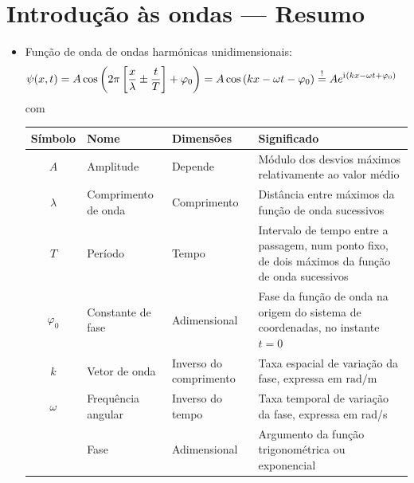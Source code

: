 \newpage
\section*{Introdução às ondas --- Resumo}
\begin{itemize}
\item
    Função de onda de ondas harmónicas unidimensionais:
    \begin{align*}
      \psi(x,t)&=A\cos\left(2\pi\left[\frac{x}{\lambda}\pm\frac{t}{T}\right]+
                \varphi_0\right)
               =A\cos\left(kx-\omega t-\varphi_0\right)\stackrel{!}{=}
               Ae^{\text{i}\mkern1mu (kx-\omega t+\varphi_0)}
    \end{align*}
    com
    \begin{center}
    \begin{tabular}{c|l|l|l}
    \hline
    \rule{0mm}{3ex} Símbolo&Nome&Dimensões&Significado\\[0.5ex]
    \hline
    $A$ & Amplitude & Depende&
        \parbox[t]{0.3\textwidth}{\rule{0mm}{4ex}Módulo dos desvios máxi\-mos
        relativamente ao valor médio}\\
    $\lambda$ & Comprimento de onda & Comprimento &
        \parbox[t]{0.3\textwidth}{\rule{0mm}{4ex}Distância entre máximos da função
        de onda sucessivos} \\
    $T$ & Período & Tempo &
        \parbox[t]{0.3\textwidth}{\rule{0mm}{4ex}Intervalo de tempo entre a
        passagem, num ponto fixo, de dois máximos da função de onda sucessivos}
    \\
    $\varphi_0$&Constante de fase&Adimensional&
        \parbox[t]{0.3\textwidth}{\rule{0mm}{4ex}Fase da função de onda na
        origem do sistema de coordenadas, no instante $t=0$}\\
    $k$&Vetor de onda&
        \parbox[t]{0.2\textwidth}{Inverso do comprimento}&
        \parbox[t]{0.3\textwidth}{\rule{0mm}{4ex}Taxa espacial de variação da fase,
        expressa em $\text{rad}/\text{m}$}\\
    $\omega$&Frequência angular &
        \parbox[t]{0.2\textwidth}{Inverso do tempo}&
        \parbox[t]{0.3\textwidth}{\rule{0mm}{4ex}Taxa temporal de variação da
        fase, expressa em rad/s}
        \\
        &Fase& Adimensional &\parbox[t]{0.3\textwidth}{\rule{0mm}{4ex}%
          Argumento da função trigonométrica ou exponencial}
    \\[3ex]
    \hline
    \end{tabular}
    \end{center}

\end{itemize}
